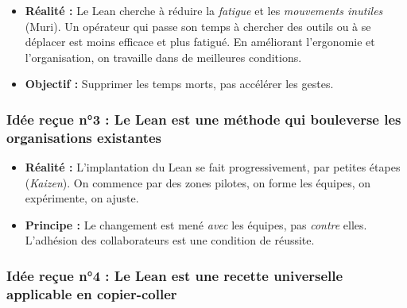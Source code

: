 \documentclass[a4paper,12pt]{article}
\begin{document}
\begin{center}
\end{center}

\begin{itemize}
    \item \textbf{Réalité :} Le Lean cherche à réduire la \textit{fatigue} et les \textit{mouvements inutiles} (Muri). Un opérateur qui passe son temps à chercher des outils ou à se déplacer est moins efficace et plus fatigué. En améliorant l'ergonomie et l'organisation, on travaille dans de meilleures conditions.
    \item \textbf{Objectif :} Supprimer les temps morts, pas accélérer les gestes.
\end{itemize}

\subsubsection{Idée reçue n°3 : Le Lean est une méthode qui bouleverse les organisations existantes}

\begin{center}
\end{center}

\begin{itemize}
    \item \textbf{Réalité :} L'implantation du Lean se fait progressivement, par petites étapes (\textit{Kaizen}). On commence par des zones pilotes, on forme les équipes, on expérimente, on ajuste.
    \item \textbf{Principe :} Le changement est mené \textit{avec} les équipes, pas \textit{contre} elles. L'adhésion des collaborateurs est une condition de réussite.
\end{itemize}

\subsubsection{Idée reçue n°4 : Le Lean est une recette universelle applicable en copier-coller}
\end{document}
